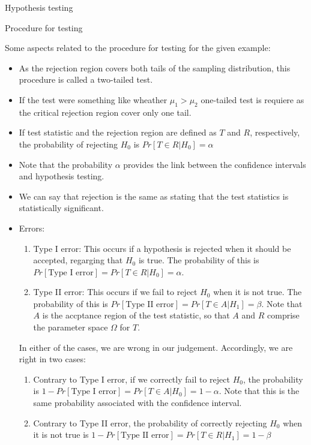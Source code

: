\documentclass[8pt]{beamer}
\renewcommand{\emph}[1]{\textcolor{myorange}{#1}}
\begin{document}
\begin{frame}{Hypothesis testing}

    \begin{block}{Procedure for testing}
    \end{block}
    \vspace{-5pt}
    Some aspects related to the procedure for testing for the given example:
    \begin{itemize}
        \item As the \emph{rejection region} covers \emph{both tails} of the \emph{sampling distribution}, this procedure is called a \alert{two-tailed test}.
        \item If the test were something like wheather $\mu_1 > \mu_2$ \alert{one-tailed test} is requiere as the critical \emph{rejection region} cover only one tail. 
        \item If \emph{test statistic} and the \emph{rejection region} are defined as $T$ and $R$, respectively, the probability of rejecting $H_0$ is $Pr\left[T \in R | H_0\right] = \alpha$
        \item Note that the probability $\alpha$ provides the link between the \emph{confidence intervals} and \emph{hypothesis testing}.
        \item We can say that \emph{rejection} is the same as stating that the \emph{test statistics} is statistically significant.
        \item Errors:
            \begin{enumerate}
                \item \alert{Type I error}: This occurs if a hypothesis is rejected when it should be accepted, regarging that $H_0$ is true. The probability of this is $Pr \left[ \text{Type I error} \right] = Pr\left[T \in R | H_0\right] = \alpha$.
                \item \alert{Type II error}: This occurs if we fail to reject $H_0$ when it is not true. The probability of this is $Pr \left[ \text{Type II error} \right] = Pr\left[T \in A | H_1\right] = \beta$. Note that $A$ is the accptance region of the test statistic, so that $A$ and $R$ comprise the parameter space $\Omega$ for $T$. 
            \end{enumerate}
 In either of the cases, we are wrong in our judgement. Accordingly, we are right in two cases:
           \begin{enumerate}
               \item Contrary to \emph{Type I error}, if we correctly fail  to reject $H_0$, the probability is $1- Pr \left[ \text{Type I error} \right] = Pr\left[T \in A | H_0\right] = 1-\alpha$. Note that this is the same probability associated with the \emph{confidence interval}. 
               \item Contrary to \emph{Type II error}, the probability of correctly rejecting $H_0$ when it is not true is $1- Pr \left[ \text{Type II error} \right] = Pr\left[T \in R | H_1\right] = 1-\beta$
            \end{enumerate}
    \end{itemize}
\end{frame}
\end{document}
